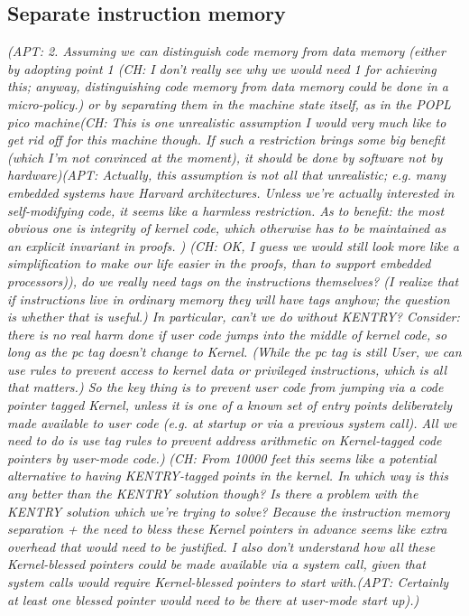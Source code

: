 \documentclass{article}
\newcommand{\ch}[1]{{\color{dkblue}\em (CH: #1)}}
\newcommand{\apt}[1]{{\color{red}\em (APT: #1)}}
\begin{document}
\subsection{Separate instruction memory}
\label{sec:sep-instrs}

\apt{
2. Assuming we can distinguish code memory from data memory (either by adopting
point 1 \ch{I don't really see why we would need 1 for achieving this;
  anyway, distinguishing code memory from data memory could be done in
  a micro-policy.}
or by separating them in the machine state itself, as in the POPL pico 
machine\ch{This is one unrealistic assumption I would very much like to get
  rid off for this machine though.  
  If such a restriction brings some big
  benefit (which I'm not convinced at the moment), it should be
  done by software not by hardware}\apt{Actually, this assumption is not all 
  that unrealistic; e.g. many embedded systems have Harvard architectures. 
  Unless we're actually interested in self-modifying code, it seems like a harmless 
  restriction. As to benefit: the most obvious one is integrity of kernel code, which 
  otherwise has to be maintained as an explicit invariant in proofs. }
  \ch{OK, I guess we would still look more like a simplification to make
    our life easier in the proofs, than to support embedded processors}),
do we really need tags on the instructions themselves? (I realize that
if instructions live in ordinary memory they will have tags anyhow; the question
is whether that is useful.)  In particular, can't we do without KENTRY?
Consider: there is no real harm done if user code jumps
into the middle of kernel code, so long as the pc tag doesn't change to Kernel.
(While the pc tag is still User, we can use rules to prevent access to kernel
data or privileged instructions, which is all that matters.)
So the key thing is to prevent user code from jumping via a code pointer tagged Kernel, 
unless it is one of a known set of entry points deliberately made available to user code
(e.g. at startup or via a previous system call).  All we need to do is use
tag rules to prevent address arithmetic on Kernel-tagged code pointers by
user-mode code.}
\ch{From 10000 feet this seems like a potential alternative to having
  KENTRY-tagged points in the kernel. In which way is this any better
  than the KENTRY solution though? Is there a problem with the KENTRY
  solution which we're trying to solve? Because the instruction memory
  separation + the need to bless these Kernel pointers in advance
  seems like extra overhead that would need to be justified. I also
  don't understand how all these Kernel-blessed pointers could be made
  available via a system call, given that system calls would require
  Kernel-blessed pointers to start with.\apt{Certainly at least one blessed pointer
  would need to be there at user-mode start up}.} 
\end{document}
